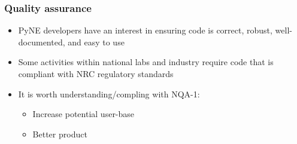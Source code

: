 \documentclass[12pt]{beamer}
\begin{document}
\begin{frame}[fragile]
\frametitle{Quality assurance}

\begin{itemize}
\item{PyNE developers have an interest in ensuring code is correct, robust,
well-documented, and easy to use}
\item{Some activities within national labs and industry require code that is compliant with NRC regulatory standards}
\item{It is worth understanding/compling with NQA-1:}
\begin{itemize}
\item{Increase potential user-base}
\item{Better product}
\end{itemize}
\end{itemize}

\end{frame}
\end{document}
